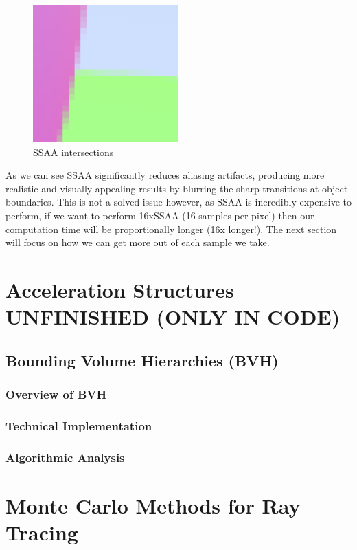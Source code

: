 \documentclass[12pt]{article}
\begin{document}
\begin{figure}[H]
    \centering
    \includegraphics[width=0.5\textwidth]{images/aliasing/aliased.png}
    \caption{SSAA intersections}
    \label{fig:antialiasedintersection}
\end{figure}

As we can see SSAA significantly reduces aliasing artifacts, producing more realistic and visually appealing results by blurring the sharp transitions at object boundaries.
This is not a solved issue however, as SSAA is incredibly expensive to perform, if we want to perform 16xSSAA (16 samples per pixel) then our computation time will be proportionally longer (16x longer!). The next section will focus on how we can get more out of each sample we take.

\section{Acceleration Structures UNFINISHED (ONLY IN CODE)}
\label{sec:acceleration-structures}
\subsection{Bounding Volume Hierarchies (BVH)}
\subsubsection{Overview of BVH}
\subsubsection{Technical Implementation}
\subsubsection{Algorithmic Analysis}

\pagebreak
\section{Monte Carlo Methods for Ray Tracing}
\label{sec:monte-carlo}
\end{document}
